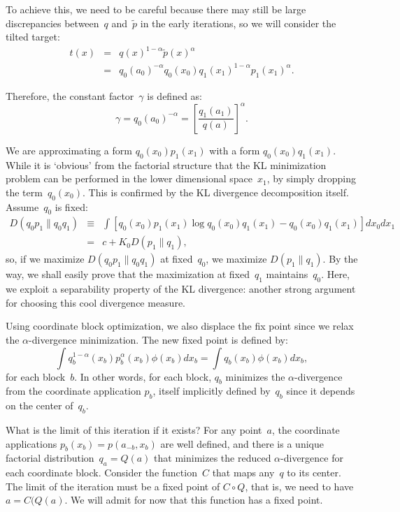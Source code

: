 \documentclass{article}
\begin{document}
To achieve this, we need to be careful because there may still be large discrepancies between~$q$ and~$\tilde{p}$ in the early iterations, so we will consider the tilted target:
\begin{eqnarray*}
t(x) 
 & = & q(x)^{1-\alpha} \tilde{p}(x)^\alpha \\
 & = & q_0(a_0)^{-\alpha} q_0(x_0) q_1(x_1)^{1-\alpha} p_1(x_1)^\alpha . 
\end{eqnarray*}

Therefore, the constant factor~$\gamma$ is defined as: 
$$
\gamma = q_0(a_0)^{-\alpha}
= \left[\frac{q_1(a_1)}{q(a)}\right]^{\alpha}.
$$

We are approximating a form $q_0(x_0)p_1(x_1)$ with a form $q_0(x_0)q_1(x_1)$. While it is `obvious' from the factorial structure that the KL minimization problem can be performed in the lower dimensional space~$x_1$, by simply dropping the term~$q_0(x_0)$. This is confirmed by the KL divergence decomposition itself. Assume~$q_0$ is fixed:
\begin{eqnarray*}
D(q_0 p_1 \| q_0 q_1) 
 & \equiv & 
 \int \left[
 q_0(x_0)p_1(x_1) 
 \log q_0(x_0)q_1(x_1) - q_0(x_0)q_1(x_1)
 \right]
 dx_0 dx_1 \\
& = & 
 c + K_0 D(p_1\|q_1),
\end{eqnarray*}
so, if we maximize $D(q_0p_1\|q_0q_1)$ at fixed~$q_0$, we maximize $D(p_1\|q_1)$. By the way, we shall easily prove that the maximization at fixed~$q_1$ maintains~$q_0$. Here, we exploit a separability property of the KL divergence: another strong argument for choosing this cool divergence measure. 

Using coordinate block optimization, we also displace the fix point since we relax the $\alpha$-divergence minimization. The new fixed point is defined by:
$$
\int q_b^{1-\alpha}(x_b)p_b^\alpha(x_b) \phi(x_b) dx_b
= \int q_b(x_b) \phi(x_b) dx_b,
$$
for each block~$b$. In other words, for each block, $q_b$ minimizes the $\alpha$-divergence from the coordinate application $p_b$, itself implicitly defined by~$q_b$ since it depends on the center of~$q_b$.

What is the limit of this iteration if it exists? For any point~$a$, the coordinate applications $p_b(x_b)=p(a_{-b},x_b)$ are well defined, and there is a unique factorial distribution~$q_a=Q(a)$ that minimizes the reduced $\alpha$-divergence for each coordinate block. Consider the function~$C$ that maps any~$q$ to its center. The limit of the iteration must be a fixed point of $C\circ Q$, that is, we need to have $a = C(Q(a)$. We will admit for now that this function has a fixed point. 
\end{document}
